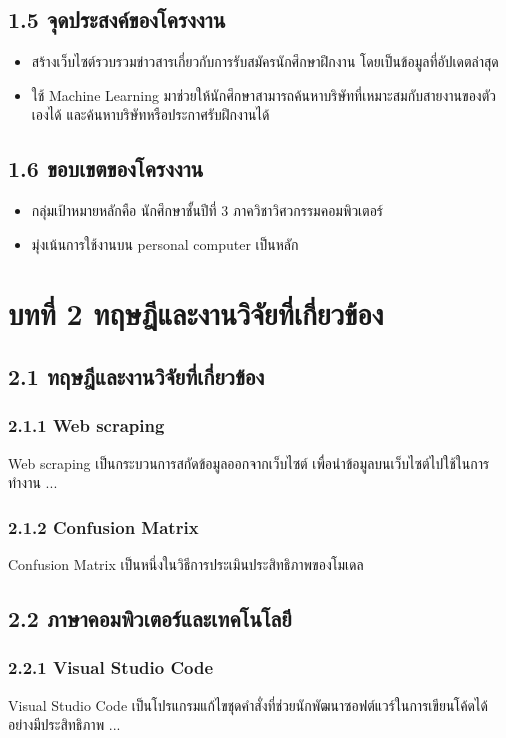 \documentclass[12pt,oneside,a4paper]{article}
\begin{document}
\subsection{1.5 จุดประสงค์ของโครงงาน}
\begin{itemize}
    \item สร้างเว็บไซต์รวบรวมข่าวสารเกี่ยวกับการรับสมัครนักศึกษาฝึกงาน โดยเป็นข้อมูลที่อัปเดตล่าสุด
    \item ใช้ Machine Learning มาช่วยให้นักศึกษาสามารถค้นหาบริษัทที่เหมาะสมกับสายงานของตัวเองได้ และค้นหาบริษัทหรือประกาศรับฝึกงานได้
\end{itemize}

\subsection{1.6 ขอบเขตของโครงงาน}
\begin{itemize}
    \item กลุ่มเป้าหมายหลักคือ นักศึกษาชั้นปีที่ 3 ภาควิชาวิศวกรรมคอมพิวเตอร์
    \item มุ่งเน้นการใช้งานบน personal computer เป็นหลัก
\end{itemize}

\newpage
\section{บทที่ 2 ทฤษฎีและงานวิจัยที่เกี่ยวข้อง}
\subsection{2.1 ทฤษฎีและงานวิจัยที่เกี่ยวข้อง}
\subsubsection{2.1.1 Web scraping}
Web scraping เป็นกระบวนการสกัดข้อมูลออกจากเว็บไซต์ เพื่อนำข้อมูลบนเว็บไซต์ไปใช้ในการทำงาน ...

\subsubsection{2.1.2 Confusion Matrix}
Confusion Matrix เป็นหนึ่งในวิธีการประเมินประสิทธิภาพของโมเดล 

\subsection{2.2 ภาษาคอมพิวเตอร์และเทคโนโลยี}
\subsubsection{2.2.1 Visual Studio Code}
Visual Studio Code เป็นโปรแกรมแก้ไขชุดคำสั่งที่ช่วยนักพัฒนาซอฟต์แวร์ในการเขียนโค้ดได้อย่างมีประสิทธิภาพ ...
\end{document}
